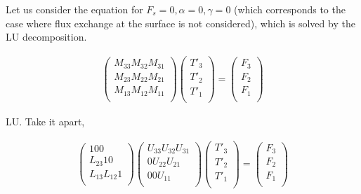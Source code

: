 Let us consider the equation for \(F_s = 0, \alpha=0, \gamma=0\) (which corresponds to the case where flux exchange at the surface is not considered), which is solved by the LU decomposition.

\begin{eqnarray}
  \left( \begin{array}{lll} M_{33}  M_{32}  M_{31} \\ M_{23}
  M_{22}  M_{21} \\ M_{13}  M_{12}  M_{11} \\
         \end{array} \right)
  \left( \begin{array}{l}
         T'_3 \\ T'_2 \\ T'_1 \\
         \end{array} \right)
  =
  \left(  \begin{array}{l}
          F_3 \\ F_2 \\ F_1 \\
          \end{array} \right)
\end{eqnarray}

LU. Take it apart,

\begin{eqnarray}
  \left( \begin{array}{lll}
         1       0       0      \\
         L_{23}  1       0      \\
         L_{13}  L_{12}  1      \\
         \end{array} \right)
  \left( \begin{array}{lll}
         U_{33}  U_{32}  U_{31} \\
         0       U_{22}  U_{21} \\
         0       0       U_{11} \\
         \end{array} \right)
  \left( \begin{array}{l}
         T'_3 \\ T'_2 \\ T'_1 \\
         \end{array} \right)
  =
  \left(  \begin{array}{l}
          F_3 \\ F_2 \\ F_1 \\
          \end{array} \right)
\end{eqnarray}

